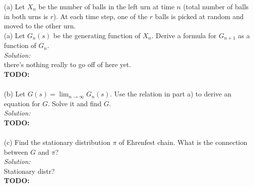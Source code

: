 \documentclass[10pt]{amsart}
\begin{document}
\newpage


 (a) Let $X_n$ be the number of balls in the left urn at time $n$ (total number of balls in both urns is $r$). At each time step, one of the $r$ balls is picked at random and moved to the other urn. \\

\noindent
(a) Let $G_n(s)$ be the generating function of $X_n$. Derive a formula for $G_{n+1}$ as a function of $G_n$. \\

\noindent
\textit{Solution:} \\
there's nothing really to go off of here yet. \\
\textbf{TODO:} \\
\begin{align*}
\end{align*}

\noindent
(b) Let $G(s)= \lim_{n \to \infty}  G_n(s)$. Use the relation in part a) to derive an equation for $G$. Solve it and find $G$. \\

\noindent
\textit{Solution:} \\
\textbf{TODO:} \\
\begin{align*}
\end{align*}

\noindent
(c) Find the stationary distribution $\pi$ of Ehrenfest chain. What is the connection between $G$ and $\pi$? \\

\noindent
\textit{Solution:} \\
Stationary distr? \\
\textbf{TODO:} \\
\begin{align*}
\end{align*}

\newpage
\end{document}
